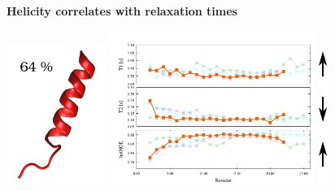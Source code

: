\addtocounter{framenumber}{-1}
\begin{frame}
\LARGE{\centering
\textbf{Helicity correlates with relaxation times} \\}
\begin{center}
 \includegraphics[height=4.5cm]{plots/helix4.pdf}
 \includegraphics[height=5cm]{plots/simul_helix14.pdf}
 \includegraphics[height=4.5cm]{plots/arrows.pdf}
\end{center}
\end{frame}


